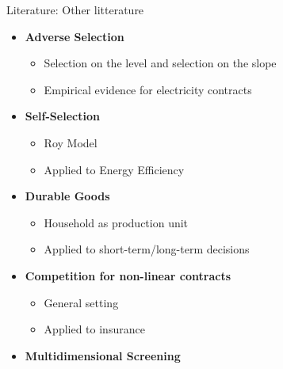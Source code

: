 \documentclass{class}
\begin{document}

\begin{frame}{Literature: Other litterature }\label{Lit_Mkt2}
    
    
\begin{itemize}

   \item \textbf{Adverse Selection}
   \begin{itemize}
       \item Selection on the level and selection on the slope \cite{Einav2011,Einav2021}
       \item Empirical evidence for electricity contracts \cite{Ito2023}
   \end{itemize}


\vfill

   \item \textbf{Self-Selection}
    \begin{itemize}
        \item Roy Model \cite{Barro2013}
        \item Applied to Energy Efficiency \cite{Allcott2014}
    \end{itemize}

\vfill

   \item \textbf{Durable Goods}
   \begin{itemize}
       \item Household as production unit \cite{Becker1965}
       \item Applied to short-term/long-term decisions \cite{Feger2022} 
   \end{itemize}

\vfill

   \item \textbf{Competition for non-linear contracts}
   \begin{itemize}
       \item General setting \cite{Stole2007}
       \item Applied to insurance \cite{Rothschild1976,Dosis2022} 
   \end{itemize}
   
\vfill

   \item \textbf{Multidimensional Screening} \cite{Rochet1998}
   
\end{itemize}
\vfill

\hyperlink{SecondCont}{}

\end{frame}
\end{document}
